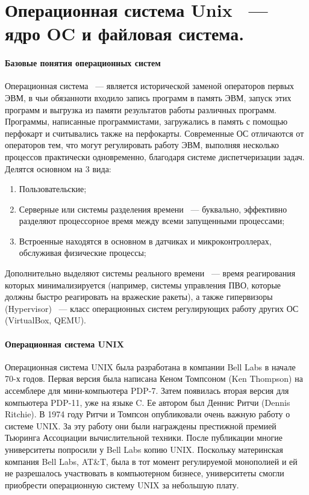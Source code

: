 \documentclass[10pt]{article}
\begin{document}
	\section{Операционная система Unix ~--- ядро OC и файловая система.}
	\paragraph{Базовые понятия операционных систем}
	Операционная система ~--- является исторической заменой операторов первых ЭВМ, в чьи обязанноти входило запись программ в память ЭВМ, запуск этих программ и выгрузка из памяти результатов работы различных программ. Программы, написанные программистами, загружались в память с помощью перфокарт и считывались также на перфокарты. Современные ОС отличаются от операторов тем, что могут регулировать работу ЭВМ, выполняя несколько процессов практически одновременно, благодаря системе диспетчеризации задач. Делятся основном на 3 вида:
	\begin{enumerate}
		\item Пользовательские;
		\item Серверные или системы разделения времени ~--- буквально, эффективно разделяют процессорное время между всеми запущенными процессами;
		\item Встроенные находятся в основном в датчиках и микроконтроллерах, обслуживая физические процессы;
	\end{enumerate}
	Дополнительно выделяют системы реального времени ~--- время реагирования которых минимализируется (например, системы управления ПВО, которые должны быстро реагировать на вражеские ракеты), а также гипервизоры (Hypervisor) ~--- класс операционных систем регулирующих работу других ОС (VirtualBox, QEMU).
	\paragraph{Операционная система UNIX}
	Операционная система UNIX была разработана в компании Bell Labs в начале 70-х годов. Первая версия была написана Кеном Томпсоном (Ken Thompson) на ассемблере для мини-компьютера PDP-7. Затем появилась вторая версия для компьютера PDP-11, уже на языке C. Ее автором был Деннис Ритчи (Dennis Ritchie). В 1974 году Ритчи и Томпсон опубликовали очень важную работу о системе UNIX. За эту работу они были награждены престижной премией Тьюринга Ассоциации вычислительной техники. После публикации многие университеты попросили у Bell Labs копию UNIX. Поскольку материнская компания Bell Labs, AT\&T, была в тот момент регулируемой монополией и ей не разрешалось участвовать в компьютерном бизнесе, университеты смогли приобрести операционную систему UNIX за небольшую плату.
\end{document}
